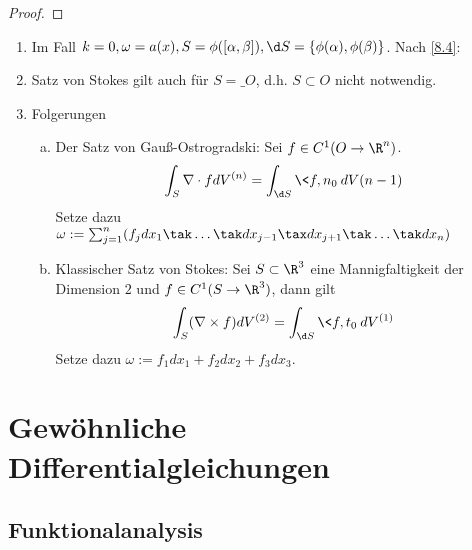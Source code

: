 \documentclass[a4paper,10pt]{scrartcl}
\begin{document}
\begin{proof}
\begin{enumerate}[1)]
{\begin{align*}
{					Integriere jetzt partiell und beachte: $(\psi_j a)\circ \psi = 0$ für $y_l = \pm \sqrt{1-|y^{(l)}|^2}$ da $\supp \psi_j \le U_j$.
					Außerdem $\sum_{l=1}^{k+1} (-1)^{l+1} \d y_l (\det (\dotsc)) = 0$ (Nachrechnen).
				}
				&= \begin{cases}
					0 & L+1 \le j \le N \\
					\int_{\tilde U_j} \psi \omega \stackrel{\tilde U_j = \tilde \phi_j(K_1^{(k)}(0))}= (-1)^{i+1} \int_{y^{(i)}\in K_1^{(k)}(0)} (\psi_j a) \circ \phi_j (0,y^{(1)}) \det(\tf{\d g_J}{\d y^{(1)}}) dy^{(1)} & 
				\end{cases}
			\end{align*}
	\end{enumerate}
\end{proof}

\begin{nt*} \label{8.8}
	\begin{enumerate}[1)]
		\item
			Im Fall $k=0, \omega = a(x), S = \phi([\alpha,\beta]), \d S = \{\phi(\alpha), \phi(\beta)\}$.
			Nach \ref{8.4}:
		\item
			Satz von Stokes gilt auch für $S= \_{O}$, d.h. $S \subset O$ nicht notwendig.
		\item
			Folgerungen
			\begin{enumerate}[a)]
				\item
					Der Satz von Gauß-Ostrogradski:
					Sei $f\in C^1(O\to \R^n)$.
					\[
						\int_{S} \nabla \cdot f dV^{(n)} = \int_{\d S} \<f,n_0\> dV{(n-1)}
					\]
					Setze dazu $\omega := \sum_{j=1}^n (f_j dx_1 \tak \dotsc \tak dx_{j-1} \tax dx_{j+1} \tak \dotsc \tak dx_n)$
				\item
					Klassischer Satz von Stokes:
					Sei $S \subset \R^3$ eine Mannigfaltigkeit der Dimension $2$ und $f \in C^1(S \to \R^3)$, dann gilt
					\[
						\int_S (\nabla \times f) dV^{(2)} = \int_{\d S}\<f,t_0\> dV^{(1)}
					\]
					Setze dazu $\omega := f_1 dx_1 + f_2 dx_2 + f_3 dx_3$.
			\end{enumerate}
	\end{enumerate}
\end{nt*}


\section{Gewöhnliche Differentialgleichungen}


\subsection{Funktionalanalysis}
\end{document}
